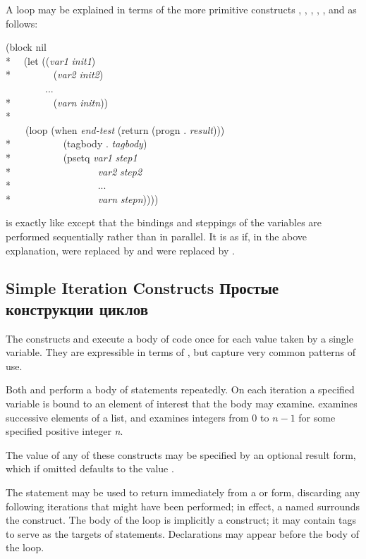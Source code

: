 \begin{defmac}
A  loop may be explained in terms of the more primitive constructs
, , , , ,
and  as follows:
\begin{lisp}
(block nil \\*
~~(let ((\emph{var1} \emph{init1}) \\*
~~~~~~~~(\emph{var2} \emph{init2}) \\
~~~~~~~~... \\*
~~~~~~~~(\emph{varn} \emph{initn})) \\*
~~~~ \\
~~~~(loop (when \emph{end-test} (return (progn . \emph{result}))) \\*
~~~~~~~~~~(tagbody . \emph{tagbody}) \\*
~~~~~~~~~~(psetq \emph{var1} \emph{step1} \\*
~~~~~~~~~~~~~~~~~\emph{var2} \emph{step2} \\*
~~~~~~~~~~~~~~~~~... \\*
~~~~~~~~~~~~~~~~~\emph{varn} \emph{stepn}))))
\end{lisp}
 is exactly like  except that the bindings and steppings
of the variables are performed sequentially rather than in parallel.
It is as if, in the above explanation,
 were replaced by  and  were replaced
by .
\end{defmac}

\subsection{Simple Iteration Constructs Простые конструкции циклов}

The constructs  and  execute a body of code
once for each value taken by a single variable.  They are expressible
in terms of , but capture very common patterns of use.

Both  and  perform
a body of statements repeatedly.  On each iteration a specified
variable is bound to an element of interest that the body may
examine.   examines successive elements of a list,
and  examines integers from 0 to $n-1$
for some specified positive integer \emph{n}.

The value of any of these constructs may be specified by an optional result
form, which if omitted defaults to the value {\false}.

The  statement may be used to return
immediately from a  or  form,
discarding any following iterations
that might have been performed; in effect, a  named {\nil}
surrounds the construct.
The body of the loop is implicitly a  construct;
it may contain tags to serve as the targets of  statements.
Declarations may appear before the body of the loop.

